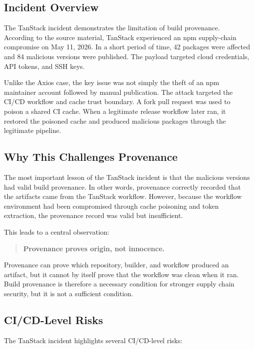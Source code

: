 \documentclass[12pt,a4paper]{article}
\begin{document}
\subsection{Incident Overview}

The TanStack incident demonstrates the limitation of build provenance. According to the source material, TanStack experienced an npm supply-chain compromise on May 11, 2026. In a short period of time, 42 packages were affected and 84 malicious versions were published. The payload targeted cloud credentials, API tokens, and SSH keys.

Unlike the Axios case, the key issue was not simply the theft of an npm maintainer account followed by manual publication. The attack targeted the CI/CD workflow and cache trust boundary. A fork pull request was used to poison a shared CI cache. When a legitimate release workflow later ran, it restored the poisoned cache and produced malicious packages through the legitimate pipeline.

\subsection{Why This Challenges Provenance}

The most important lesson of the TanStack incident is that the malicious versions had valid build provenance. In other words, provenance correctly recorded that the artifacts came from the TanStack workflow. However, because the workflow environment had been compromised through cache poisoning and token extraction, the provenance record was valid but insufficient.

This leads to a central observation:

\begin{quote}
\textbf{Provenance proves origin, not innocence.}
\end{quote}

Provenance can prove which repository, builder, and workflow produced an artifact, but it cannot by itself prove that the workflow was clean when it ran. Build provenance is therefore a necessary condition for stronger supply chain security, but it is not a sufficient condition.

\subsection{CI/CD-Level Risks}

The TanStack incident highlights several CI/CD-level risks:
\end{document}

